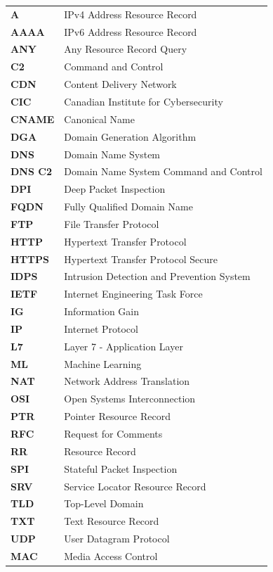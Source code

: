\documentclass[14pt, a4paper, oneside]{report}
\begin{document}
\begin{longtable}[l]{@{}ll}

    \textbf{A}        & IPv4 Address Resource Record \\
    \textbf{AAAA}     & IPv6 Address Resource Record \\
    \textbf{ANY}      & Any Resource Record Query \\
    \textbf{C2}       & Command and Control \\
    \textbf{CDN}      & Content Delivery Network \\
    \textbf{CIC}      & Canadian Institute for Cybersecurity \\
    \textbf{CNAME}    & Canonical Name \\
    \textbf{DGA}      & Domain Generation Algorithm \\
    \textbf{DNS}      & Domain Name System \\
    \textbf{DNS C2}   & Domain Name System Command and Control \\
    \textbf{DPI}      & Deep Packet Inspection \\
    \textbf{FQDN}     & Fully Qualified Domain Name \\
    \textbf{FTP}      & File Transfer Protocol \\
    \textbf{HTTP}     & Hypertext Transfer Protocol \\
    \textbf{HTTPS}    & Hypertext Transfer Protocol Secure \\
    \textbf{IDPS}     & Intrusion Detection and Prevention System \\
    \textbf{IETF}     & Internet Engineering Task Force \\
    \textbf{IG}       & Information Gain \\
    \textbf{IP}       & Internet Protocol \\
    \textbf{L7}       & Layer 7 - Application Layer \\
    \textbf{ML}       & Machine Learning \\
    \textbf{NAT} & Network Address Translation \\
    \textbf{OSI}      & Open Systems Interconnection \\
    \textbf{PTR}      & Pointer Resource Record \\
    \textbf{RFC}      & Request for Comments \\
    \textbf{RR}       & Resource Record \\
    \textbf{SPI}      & Stateful Packet Inspection \\
    \textbf{SRV}      & Service Locator Resource Record \\
    \textbf{TLD}      & Top-Level Domain \\
    \textbf{TXT}      & Text Resource Record \\
    \textbf{UDP}      & User Datagram Protocol \\
    \textbf{MAC}      & Media Access Control \\
    
\end{longtable}
\end{document}
